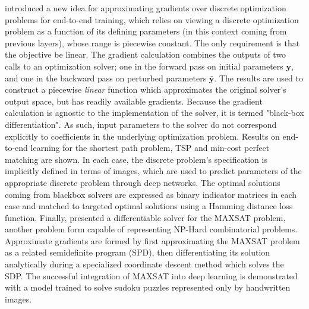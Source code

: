  introduced a new idea for approximating gradients over discrete optimization problems for end-to-end training, which relies on viewing a discrete optimization problem as a function of its defining parameters (in this context coming from previous layers), whose range is piecewise constant. The only requirement is that the objective be linear. The gradient calculation combines the outputs of two calls to an optimization solver; one in the forward pass on initial parameters $\bm{y}$, and one in the backward pass on perturbed parameters $\bar{\bm{y}}$. The results are used to construct a piecewise \emph{linear} function which approximates the original solver's output space, but has readily available gradients. Because the gradient calculation is agnostic to the implementation of the solver, it is termed "black-box differentiation". As such, input parameters to the solver do not correspond explicitly to coefficients in the underlying optimization problem. Results on end-to-end learning for the shortest path problem, TSP and min-cost perfect matching are shown. In each case, the discrete problem's specification is implicitly defined in terms of images, which are used to predict parameters of the appropriate discrete problem through deep networks. The optimal solutions coming from blackbox solvers are expressed as binary indicator matrices in each case and matched to targeted  optimal solutions using a Hamming distance loss function.
Finally,   presented a differentiable solver for the MAXSAT problem, another problem form capable of representing NP-Hard combinatorial problems. Approximate gradients are formed by first approximating the MAXSAT problem as a related semidefinite program (SPD), then differentiating its solution analytically during a specialized coordinate descent method  which solves the SDP. The successful integration of MAXSAT into deep learning is demonstrated with a model trained to solve sudoku puzzles represented only by handwritten images. 

